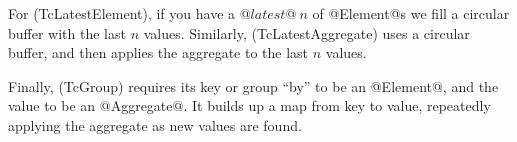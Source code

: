 For (TcLatestElement), if you have a $@latest@~n$ of @Element@s we fill a circular buffer with the last $n$ values.
Similarly, (TcLatestAggregate) uses a circular buffer, and then applies the aggregate to the last $n$ values.

Finally, (TcGroup) requires its key or group ``by'' to be an @Element@, and the value to be an @Aggregate@.
It builds up a map from key to value, repeatedly applying the aggregate as new values are found.




